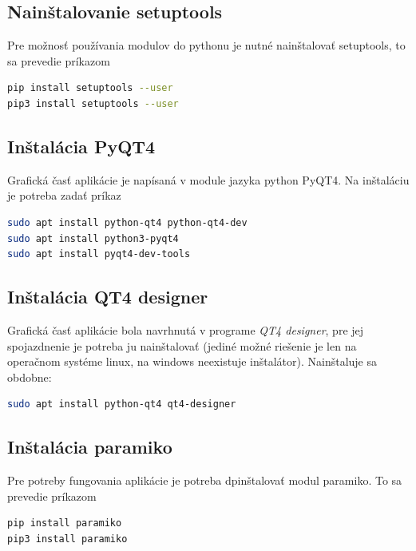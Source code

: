 \subsection{Nainštalovanie setuptools}
Pre možnosť používania modulov do pythonu je nutné nainštalovať setuptools, to sa prevedie príkazom
\begin{lstlisting}[language=bash, frame=single, caption=Nainštalovanie setuptools,captionpos=b, showstringspaces=false]
pip install setuptools --user
pip3 install setuptools --user
\end{lstlisting}
\subsection{Inštalácia PyQT4}
Grafická časť aplikácie je napísaná v module jazyka python PyQT4. Na inštaláciu je potreba zadať príkaz
\begin{lstlisting}[language=bash, frame=single, caption=Nainštalovanie pyqt4,captionpos=b, showstringspaces=false]
sudo apt install python-qt4 python-qt4-dev
sudo apt install python3-pyqt4
sudo apt install pyqt4-dev-tools
\end{lstlisting}
\subsection{Inštalácia QT4 designer}
Grafická časť aplikácie bola navrhnutá v programe \textit{QT4 designer}, pre jej spojazdnenie je potreba ju nainštalovať (jediné možné riešenie je len na operačnom systéme linux, na windows neexistuje inštalátor). Nainštaluje sa obdobne:
\begin{lstlisting}[language=bash, frame=single, caption=Nainštalovanie qt4 designera,captionpos=b, showstringspaces=false]
sudo apt install python-qt4 qt4-designer
\end{lstlisting}
\subsection{Inštalácia paramiko}
Pre potreby fungovania aplikácie je potreba dpinštalovať modul paramiko. To sa prevedie príkazom
\begin{lstlisting}[language=bash, frame=single, caption=Inštalácia paramiko,captionpos=b, showstringspaces=false]
pip install paramiko
pip3 install paramiko
\end{lstlisting}
